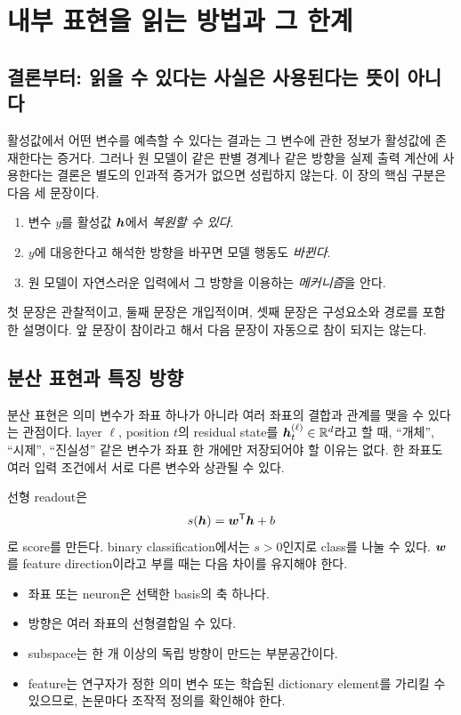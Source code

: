 \chapter{내부 표현을 읽는 방법과 그 한계}
\label{chap:phase4}

\section{결론부터: 읽을 수 있다는 사실은 사용된다는 뜻이 아니다}

활성값에서 어떤 변수를 예측할 수 있다는 결과는 그 변수에 관한 정보가 활성값에 존재한다는 증거다.
그러나 원 모델이 같은 판별 경계나 같은 방향을 실제 출력 계산에 사용한다는 결론은 별도의 인과적 증거가 없으면 성립하지 않는다.
이 장의 핵심 구분은 다음 세 문장이다.

\begin{enumerate}
  \item 변수 $y$를 활성값 $\bm{h}$에서 \emph{복원할 수 있다}.
  \item $y$에 대응한다고 해석한 방향을 바꾸면 모델 행동도 \emph{바뀐다}.
  \item 원 모델이 자연스러운 입력에서 그 방향을 이용하는 \emph{메커니즘}을 안다.
\end{enumerate}

첫 문장은 관찰적이고, 둘째 문장은 개입적이며, 셋째 문장은 구성요소와 경로를 포함한 설명이다.
앞 문장이 참이라고 해서 다음 문장이 자동으로 참이 되지는 않는다.

\section{분산 표현과 특징 방향}

분산 표현은 의미 변수가 좌표 하나가 아니라 여러 좌표의 결합과 관계를 맺을 수 있다는 관점이다.
layer $\ell$, position $t$의 residual state를 $\bm{h}^{(\ell)}_t\in\mathbb{R}^d$라고 할 때, ``개체'', ``시제'', ``진실성'' 같은 변수가 좌표 한 개에만 저장되어야 할 이유는 없다.
한 좌표도 여러 입력 조건에서 서로 다른 변수와 상관될 수 있다.

선형 readout은
\begin{equation}
  s(\bm{h})=\bm{w}^{\mathsf T}\bm{h}+b
  \label{eq:linear-readout}
\end{equation}
로 score를 만든다.
binary classification에서는 $s>0$인지로 class를 나눌 수 있다.
$\bm{w}$를 feature direction이라고 부를 때는 다음 차이를 유지해야 한다.

\begin{itemize}
  \item 좌표 또는 neuron은 선택한 basis의 축 하나다.
  \item 방향은 여러 좌표의 선형결합일 수 있다.
  \item subspace는 한 개 이상의 독립 방향이 만드는 부분공간이다.
  \item feature는 연구자가 정한 의미 변수 또는 학습된 dictionary element를 가리킬 수 있으므로, 논문마다 조작적 정의를 확인해야 한다.
\end{itemize}

